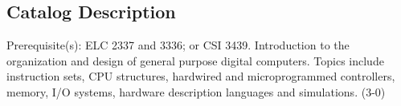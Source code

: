 \documentclass{baylorsyllabus}
\begin{document}
\subsection{Catalog Description}
Prerequisite(s): ELC 2337 and 3336; or CSI 3439.  Introduction to the organization and design of general purpose digital computers. Topics include instruction sets, CPU structures, hardwired and microprogrammed controllers, memory, I/O systems, hardware description languages and simulations. (3-0)

\Reading
\Grading
{}



\Legalese
\end{document}
